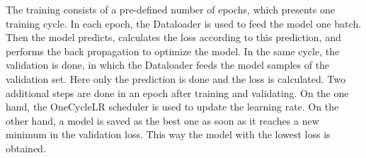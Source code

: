 \noindent The training consists of a pre-defined number of epochs, which presents one training cycle.
In each epoch, the Dataloader is used to feed the model one batch.
Then the model predicts, calculates the loss according to this prediction, and performs the back propagation to optimize the model.
In the same cycle, the validation is done, in which the Dataloader feeds the model samples of the validation set.
Here only the prediction is done and the loss is calculated.
Two additional steps are done in an epoch after training and validating.
On the one hand, the OneCycleLR scheduler \cite{pytorch_oneCycleLR_docu} is used to update the learning rate.
On the other hand, a model is saved as the best one as soon as it reaches a new minimum in the validation loss.
This way the model with the lowest loss is obtained.
